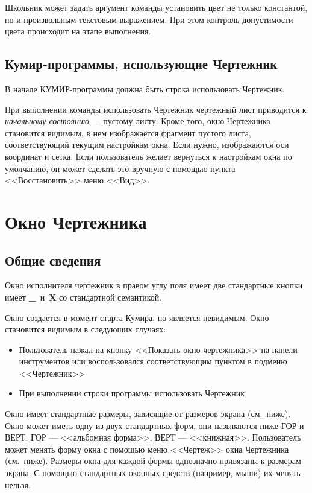 \documentclass[12pt,a4paper]{article}
\begin{document}
	Школьник может задать аргумент команды \textsf{установить цвет} не только константой, но и произвольным текстовым выражением. При этом контроль допустимости цвета происходит на этапе выполнения.


\subsection{Кумир-программы, использующие Чертежник}

В начале КУМИР-программы должна быть строка \textsf{использовать Чертежник}.

При выполнении команды \textsf{использовать Чертежник} чертежный лист  приводится к \emph{\mbox{начальному} состоянию} --- пустому листу. Кроме того,  окно Чертежника становится видимым, в нем изображается фрагмент  пустого листа, соответствующий текущим настройкам окна.  Если нужно, изображаются оси координат и сетка. Если пользователь желает вернуться к настройкам окна по умолчанию, он может сделать это вручную с помощью пункта \mbox{<<Восстановить>>} меню <<Вид>>.

\section{Окно Чертежника}

\subsection{Общие сведения}

Окно исполнителя чертежник в правом углу поля имеет две стандартные кнопки имеет \textbf{\_}~и~\textbf{X} со стандартной семантикой.

Окно создается в момент старта Кумира, но является невидимым.  Окно становится видимым в следующих случаях:
\begin{itemize}
\item Пользователь нажал на кнопку <<Показать окно чертежника>> на панели инструментов или воспользовался соответствующим пунктом в подменю <<Чертежник>>
\item При выполнении строки программы \textsf{использовать Чертежник}
\end{itemize}

Окно имеет стандартные размеры, зависящие от размеров экрана (см.~ниже). Окно может иметь одну из двух стандартных форм, они называются ниже ГОР и ВЕРТ. ГОР --- <<альбомная форма>>, ВЕРТ --- <<книжная>>. Пользователь может менять форму окна с помощью меню <<Чертеж>> окна Чертежника (см.~ниже). Размеры окна для каждой формы однозначно привязаны к размерам экрана. С помощью стандартных оконных средств (например, мыши) их менять нельзя.
\end{document}

